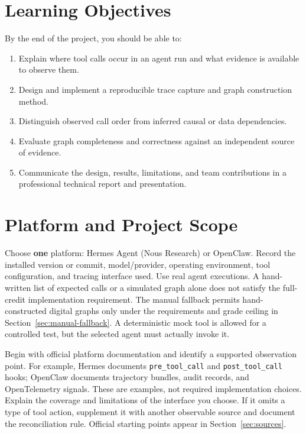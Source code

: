 \documentclass[11pt]{article}
\begin{document}
\section{Learning Objectives}
By the end of the project, you should be able to:
\begin{enumerate}
  \item Explain where tool calls occur in an agent run and what evidence is available to observe them.
  \item Design and implement a reproducible trace capture and graph construction method.
  \item Distinguish observed call order from inferred causal or data dependencies.
  \item Evaluate graph completeness and correctness against an independent source of evidence.
  \item Communicate the design, results, limitations, and team contributions in a professional technical report and presentation.
\end{enumerate}

\section{Platform and Project Scope}
Choose \textbf{one} platform: Hermes Agent (Nous Research) or OpenClaw. Record the installed version or commit, model/provider, operating environment, tool configuration, and tracing interface used. Use real agent executions. A hand-written list of expected calls or a simulated graph alone does not satisfy the full-credit implementation requirement. The manual fallback permits hand-constructed digital graphs only under the requirements and grade ceiling in Section~\ref{sec:manual-fallback}. A deterministic mock tool is allowed for a controlled test, but the selected agent must actually invoke it.

Begin with official platform documentation and identify a supported observation point. For example, Hermes documents \texttt{pre\_tool\_call} and \texttt{post\_tool\_call} hooks; OpenClaw documents trajectory bundles, audit records, and OpenTelemetry signals. These are examples, not required implementation choices. Explain the coverage and limitations of the interface you choose. If it omits a type of tool action, supplement it with another observable source and document the reconciliation rule. Official starting points appear in Section~\ref{sec:sources}.
\end{document}
